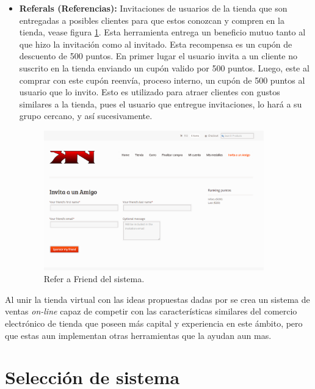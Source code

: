 \begin{itemize}
    \item {\bf Referals (Referencias):}
        Invitaciones de usuarios de la tienda que son entregadas a posibles
        clientes para que estos conozcan y compren en la tienda, vease figura 
	\ref{fig:referal}.
        Esta herramienta entrega un beneficio mutuo tanto al que hizo la invitación
        como al invitado. Esta recompensa es un cupón de descuento de 500 puntos.
        En primer lugar el usuario invita a un cliente no suscrito en la tienda
        enviando un cupón valido por 500 puntos.
        Luego, este al comprar con este cupón reenvía,
        proceso interno, un cupón de 500 puntos al usuario que lo invito.
        Esto es utilizado para atraer clientes con gustos similares
        a la tienda, pues el usuario que entregue invitaciones, lo hará a su
        grupo cercano, y así sucesivamente.

\begin{figure}[!htb]
  \centering
  \includegraphics[width=0.9\textwidth]{images/Tienda/Tienda_referal.png}
  \caption[Referal]{Refer a Friend del sistema.}
  \label{fig:referal}
\end{figure}

\end{itemize}

Al unir la tienda virtual con las ideas propuestas dadas por {\GAM} se crea un
sistema de ventas \emph{on-line} capaz de competir con las características similares del
comercio electrónico de tienda que poseen más capital y experiencia en este ámbito,
pero que estas aun implementan otras herramientas que la ayudan aun mas.

\section{Selección de sistema}

